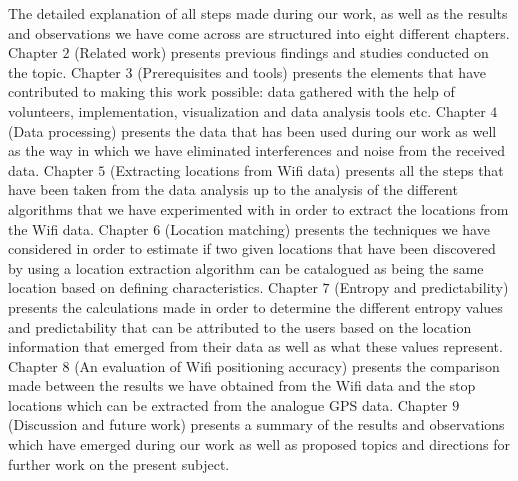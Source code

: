 The detailed explanation of all steps made during our work, as well as the
results and observations we have come across are structured into eight different
chapters. Chapter $2$ (Related work) presents previous findings and studies
conducted on the topic. Chapter $3$ (Prerequisites and tools) presents the
elements that have contributed to making this work possible: data gathered with
the help of volunteers, implementation, visualization and data analysis tools
etc. Chapter $4$ (Data processing) presents the data that has been used during
our work as well as the way in which we have eliminated interferences and noise
from the received data. Chapter $5$ (Extracting locations from Wifi data)
presents all the steps that have been taken from the data analysis up to the
analysis of the different algorithms that we have experimented with in order to
extract the locations from the Wifi data. Chapter $6$ (Location matching)
presents the techniques we have considered in order to estimate if two given
locations that have been discovered by using a location extraction algorithm can
be catalogued as being the same location based on defining characteristics.
Chapter $7$ (Entropy and predictability) presents the calculations made in order
to determine the different entropy values and predictability that can be
attributed to the users based on the location information that emerged from
their data as well as what these values represent. Chapter $8$ (An evaluation
of Wifi positioning accuracy) presents the comparison made between the results
we have obtained from the Wifi data and the stop locations which can be
extracted from the analogue GPS data. Chapter $9$ (Discussion and future work)
presents a summary of the results and observations which have emerged during
our work as well as proposed topics and directions for further work on the
present subject.
